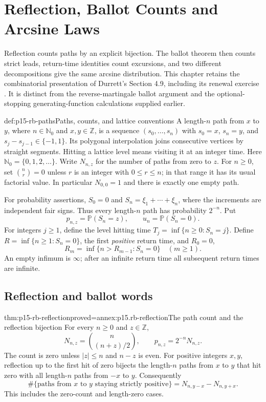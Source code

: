 \chapter{Reflection, Ballot Counts and Arcsine Laws}
\label{sec:p15-reflection-and-ballot-counts}

Reflection counts paths by an explicit bijection. The ballot theorem
then counts strict leads, return-time identities count excursions, and
two different decompositions give the same arcsine distribution.
This chapter retains the combinatorial presentation of Durrett's
Section 4.9, including its renewal exercise
\cite[pp.~262--267]{DurrettPTEAuthor2019}.
It is distinct from the reverse-martingale ballot argument and the
optional-stopping generating-function calculations supplied earlier.

\begin{hbdefinition}{def:p15-rb-paths}{Paths, counts, and lattice conventions}
A length-\(n\) path from \(x\) to \(y\), where
\(n\in\mathbb N_0\) and \(x,y\in\mathbb Z\), is a sequence
\((s_0,\ldots,s_n)\) with \(s_0=x\), \(s_n=y\), and
\(s_j-s_{j-1}\in\{-1,1\}\).
Its polygonal interpolation joins consecutive vertices by straight
segments. Hitting a lattice level means visiting it at an integer time.
Here \(\mathbb N_0=\{0,1,2,\ldots\}\).
Write \(N_{n,z}\) for the number of paths from zero to \(z\).
For \(n\geq0\), set \(\binom nr=0\) unless \(r\) is an
integer with \(0\leq r\leq n\); in that range it has its
usual factorial value. In particular \(N_{0,0}=1\) and
there is exactly one empty path.

For probability assertions, \(S_0=0\) and
\(S_n=\xi_1+\cdots+\xi_n\), where the increments are
independent fair signs. Thus every length-\(n\) path has
probability \(2^{-n}\). Put
\[
 p_{n,z}=\mathbb P(S_n=z),\qquad
 u_n=\mathbb P(S_n=0).
 \]
For integers \(j\geq1\), define the level hitting time
\(T_j=\inf\{n\geq0:S_n=j\}\).
Define \(R=\inf\{n\geq1:S_n=0\}\), the first \emph{positive}
return time, and \(R_0=0\),
\[
 R_m=\inf\{n>R_{m-1}:S_n=0\}\quad(m\geq1).
 \]
An empty infimum is \(\infty\); after an infinite return time
all subsequent return times are infinite.
\end{hbdefinition}

\section{Reflection and ballot words}
\label{sec:p15-rb-reflection}

\begin{hbtheorem}{thm:p15-rb-reflection}{proved=annex:p15.rb-reflection}{The path count and the reflection bijection}
For every \(n\geq0\) and \(z\in\mathbb Z\),
\[
 N_{n,z}=\binom n{(n+z)/2},\qquad
 p_{n,z}=2^{-n}N_{n,z}.
 \]
The count is zero unless \(|z|\leq n\) and \(n-z\) is even.
For positive integers \(x,y\), reflection up to the first hit
of zero bijects the length-\(n\) paths from \(x\) to \(y\)
that hit zero with all length-\(n\) paths from \(-x\) to \(y\).
Consequently
\[
 \#\{\text{paths from }x\text{ to }y\text{ staying strictly positive}\}
                  =N_{n,y-x}-N_{n,y+x}.
 \]
This includes the zero-count and length-zero cases.
\end{hbtheorem}

